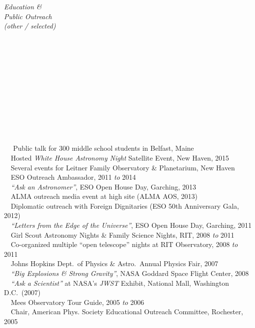 \documentclass[11pt]{article}
\begin{document}
\vspace{4mm}




\hspace{2.5mm} \parbox{1.5in}{\textit{Education \& \\ Public Outreach \\ (other / selected) \\\\\\\\\\\\\\\\\\\\\\\\}} \parbox{5.15in}{
\textbullet~~ Public talk for 300 middle school students in Belfast, Maine\\
\textbullet~~Hosted \textit{White House Astronomy Night} Satellite Event, New Haven, 2015
\\
\textbullet~~Several events for Leitner Family Observatory \& Planetarium, New Haven
\\
\textbullet~~ESO Outreach Ambassador, 2011 \textit{to} 2014
\\\textbullet~~\textit{``Ask an Astronomer''}, ESO Open House Day, Garching, 2013
\\\textbullet~~ALMA outreach media event at high site (ALMA AOS, 2013)
\\\textbullet~~Diplomatic outreach with Foreign Dignitaries (ESO 50th Anniversary Gala, 2012)
\\ \textbullet~~\textit{``Letters from the Edge of the Universe''}, ESO Open House Day, Garching, 2011
\\ \textbullet~~Girl Scout Astronomy Nights \& Family Science Nights, RIT, 2008 \textit{to} 2011
\\ \textbullet~~Co-organized multiple ``open telescope'' nights at RIT Observatory, 2008 \textit{to} 2011
\\ \textbullet~~Johns Hopkins Dept.~of Physics \& Astro.~Annual Physics Fair, 2007
\\ \textbullet~~\textit{``Big Explosions \& Strong Gravity''}, NASA Goddard Space Flight Center, 2008
\\ \textbullet~~\textit{``Ask a Scientist''} at NASA's \textit{JWST} Exhibit, National Mall, Washington D.C.~(2007)
\\ \textbullet~~Mees Observatory Tour Guide, 2005 \textit{to} 2006
\\ \textbullet~~Chair, American Phys. Society Educational Outreach Committee, Rochester, 2005
}
\end{document}
